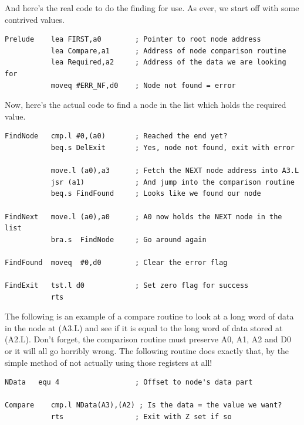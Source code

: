 And here's the real code to do the finding for use. As ever, we
      start off with some contrived values.

\begin{lstlisting}[firstnumber=1,caption={Finding a Node - Prelude},label={lst:FindingANodePrelude}]
Prelude    lea FIRST,a0        ; Pointer to root node address
           lea Compare,a1      ; Address of node comparison routine
           lea Required,a2     ; Address of the data we are looking for
           moveq #ERR_NF,d0    ; Node not found = error
\end{lstlisting}

Now, here's the actual code to find a node in the list which holds
      the required value.

\begin{lstlisting}[firstnumber=last,caption={Finding a Node},label={lst:FindingANode}]
FindNode   cmp.l #0,(a0)       ; Reached the end yet?
           beq.s DelExit       ; Yes, node not found, exit with error

           move.l (a0),a3      ; Fetch the NEXT node address into A3.L
           jsr (a1)            ; And jump into the comparison routine
           beq.s FindFound     ; Looks like we found our node

FindNext   move.l (a0),a0      ; A0 now holds the NEXT node in the list
           bra.s  FindNode     ; Go around again

FindFound  moveq  #0,d0        ; Clear the error flag

FindExit   tst.l d0            ; Set zero flag for success
           rts
\end{lstlisting}

The following is an example of a compare routine to look at a long
      word of data in the node at (A3.L) and see if it is equal to the long
      word of data stored at (A2.L). Don't forget, the comparison routine must
      preserve A0, A1, A2 and D0 or it will all go horribly wrong. The
      following routine does exactly that, by the simple method of not
      actually using those registers at all!

\begin{lstlisting}[firstnumber=1,caption={Finding a Node - Data Comparison},label={lst:FindingANodeDataComparison}]
NData   equ 4                  ; Offset to node's data part

Compare    cmp.l NData(A3),(A2) ; Is the data = the value we want?
           rts                 ; Exit with Z set if so
\end{lstlisting}

